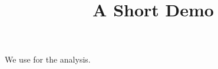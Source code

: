 \documentclass[article]{jss}
\title{A Short Demo}
\begin{document}
We use  for the analysis.
\end{document}
